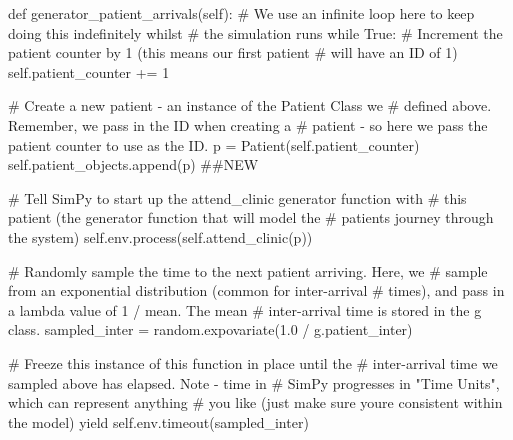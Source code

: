 \documentclass[
  letterpaper,
  DIV=11,
  numbers=noendperiod]{scrreprt}
\newenvironment{Shaded}{\begin{snugshade}}{\end{snugshade}}
\newcommand{\CommentTok}[1]{\textcolor[rgb]{0.37,0.37,0.37}{#1}}
\newcommand{\ControlFlowTok}[1]{\textcolor[rgb]{0.00,0.23,0.31}{#1}}
\newcommand{\DecValTok}[1]{\textcolor[rgb]{0.68,0.00,0.00}{#1}}
\newcommand{\FloatTok}[1]{\textcolor[rgb]{0.68,0.00,0.00}{#1}}
\newcommand{\KeywordTok}[1]{\textcolor[rgb]{0.00,0.23,0.31}{#1}}
\newcommand{\NormalTok}[1]{\textcolor[rgb]{0.00,0.23,0.31}{#1}}
\newcommand{\OperatorTok}[1]{\textcolor[rgb]{0.37,0.37,0.37}{#1}}
\newcommand{\VariableTok}[1]{\textcolor[rgb]{0.07,0.07,0.07}{#1}}
\begin{document}
\begin{Shaded}
\begin{Highlighting}[]
\KeywordTok{def}\NormalTok{ generator\_patient\_arrivals(}\VariableTok{self}\NormalTok{):}
        \CommentTok{\# We use an infinite loop here to keep doing this indefinitely whilst}
        \CommentTok{\# the simulation runs}
        \ControlFlowTok{while} \VariableTok{True}\NormalTok{:}
            \CommentTok{\# Increment the patient counter by 1 (this means our first patient}
            \CommentTok{\# will have an ID of 1)}
            \VariableTok{self}\NormalTok{.patient\_counter }\OperatorTok{+=} \DecValTok{1}

            \CommentTok{\# Create a new patient {-} an instance of the Patient Class we}
            \CommentTok{\# defined above.  Remember, we pass in the ID when creating a}
            \CommentTok{\# patient {-} so here we pass the patient counter to use as the ID.}
\NormalTok{            p }\OperatorTok{=}\NormalTok{ Patient(}\VariableTok{self}\NormalTok{.patient\_counter)}
            \VariableTok{self}\NormalTok{.patient\_objects.append(p) }\CommentTok{\#\#NEW}

            \CommentTok{\# Tell SimPy to start up the attend\_clinic generator function with}
            \CommentTok{\# this patient (the generator function that will model the}
            \CommentTok{\# patient\textquotesingle{}s journey through the system)}
            \VariableTok{self}\NormalTok{.env.process(}\VariableTok{self}\NormalTok{.attend\_clinic(p))}

            \CommentTok{\# Randomly sample the time to the next patient arriving.  Here, we}
            \CommentTok{\# sample from an exponential distribution (common for inter{-}arrival}
            \CommentTok{\# times), and pass in a lambda value of 1 / mean.  The mean}
            \CommentTok{\# inter{-}arrival time is stored in the g class.}
\NormalTok{            sampled\_inter }\OperatorTok{=}\NormalTok{ random.expovariate(}\FloatTok{1.0} \OperatorTok{/}\NormalTok{ g.patient\_inter)}

            \CommentTok{\# Freeze this instance of this function in place until the}
            \CommentTok{\# inter{-}arrival time we sampled above has elapsed.  Note {-} time in}
            \CommentTok{\# SimPy progresses in "Time Units", which can represent anything}
            \CommentTok{\# you like (just make sure you\textquotesingle{}re consistent within the model)}
            \ControlFlowTok{yield} \VariableTok{self}\NormalTok{.env.timeout(sampled\_inter)}
\end{Highlighting}
\end{Shaded}
\end{document}
